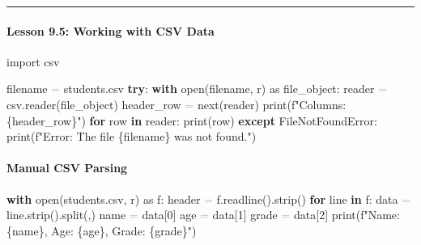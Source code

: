 \documentclass[
  justified,
  openright,
]{tufte-book}
\let\subsection\paragraph
\let\paragraph\paragraph
\newcommand{\KeywordTok}[1]{\textcolor{CodeKeyword}{\textbf{#1}}}  %
\newcommand{\StringTok}[1]{\textcolor{CodeString}{#1}}              %
\newcommand{\CodeNumTok}[1]{\textcolor{CodeNumber}{#1}}             %
\newcommand{\CodeAccentTok}[1]{\textcolor{CodeAccent}{#1}}          %
\newcommand{\OperatorTok}[1]{\textcolor{DarkGray}{#1}}              %
\newenvironment{Shaded}{%
  \begin{mdframed}[style=TufteCode]%
}{%
  \end{mdframed}%
}
\let\subsection\paragraph
\let\paragraph\paragraph
\begin{document}
\begin{center}\rule{0.5\linewidth}{0.5pt}\end{center}

\subsection{Lesson 9.5: Working with CSV
Data}\label{lesson-9.5-working-with-csv-data}

\begin{Shaded}
\begin{Highlighting}[]
\CodeAccentTok{import} csv
 
filename \OperatorTok{=} \StringTok{\textquotesingle{}students.csv\textquotesingle{}}
\KeywordTok{try}:
    \KeywordTok{with} open(filename, \StringTok{\textquotesingle{}r\textquotesingle{}}) \CodeAccentTok{as} file\_object:
        reader \OperatorTok{=} csv.reader(file\_object)
        header\_row \OperatorTok{=} next(reader)
        print(\StringTok{f"Columns: }\StringTok{\{}header\_row\StringTok{\}}\StringTok{"})
        \KeywordTok{for} row \KeywordTok{in} reader:
            print(row)
\KeywordTok{except} \CodeAccentTok{FileNotFoundError}:
    print(\StringTok{f"Error: The file }\StringTok{\{}filename\StringTok{\}}\StringTok{ was not found."})
\end{Highlighting}
\end{Shaded}

\subsection{Manual CSV Parsing}\label{manual-csv-parsing}

\begin{Shaded}
\begin{Highlighting}[]
\KeywordTok{with} open(\StringTok{\textquotesingle{}students.csv\textquotesingle{}}, \StringTok{\textquotesingle{}r\textquotesingle{}}) \CodeAccentTok{as} f:
    header \OperatorTok{=} f.readline().strip()
    \KeywordTok{for} line \KeywordTok{in} f:
        data \OperatorTok{=} line.strip().split(\StringTok{\textquotesingle{},\textquotesingle{}})
        name \OperatorTok{=} data[\CodeNumTok{0}]
        age \OperatorTok{=} data[\CodeNumTok{1}]
        grade \OperatorTok{=} data[\CodeNumTok{2}]
        print(\StringTok{f"Name: }\StringTok{\{}name\StringTok{\}}\StringTok{, Age: }\StringTok{\{}age\StringTok{\}}\StringTok{, Grade: }\StringTok{\{}grade\StringTok{\}}\StringTok{"})
\end{Highlighting}
\end{Shaded}
\end{document}
